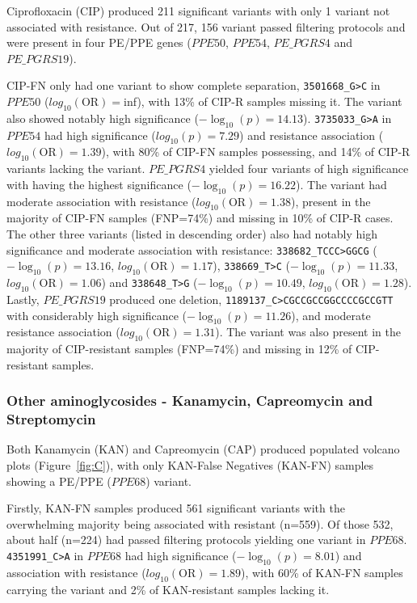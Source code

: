 Ciprofloxacin (CIP) produced 211 significant variants with only 1 variant not associated with resistance. Out of 217, 156 variant passed filtering protocols and were present in four PE/PPE genes ($PPE50$, $PPE54$, $PE\_PGRS4$ and $PE\_PGRS19$). 

CIP-FN only had one variant to show complete separation, \texttt{3501668\_G>C} in $PPE50$ ($log_{10}(\text{OR})=$inf), with 13\% of CIP-R samples missing it. The variant also showed notably high significance ($-\log_{10}(p)=14.13$). \texttt{3735033\_G>A} in $PPE54$ had high significance ($log_{10}(p)=7.29$) and resistance association ($log_{10}(\text{OR})=1.39$), with 80\% of CIP-FN samples possessing, and 14\% of CIP-R variants lacking the variant. $PE\_PGRS4$ yielded four variants of high significance with  having the highest significance ($-\log_{10}(p)=16.22$). The variant had moderate association with resistance ($log_{10}(\text{OR})=1.38$), present in the majority of CIP-FN samples (FNP=74\%) and missing in 10\% of CIP-R cases. The other three variants (listed in descending order) also had notably high significance and moderate association with resistance: \texttt{338682\_TCCC>GGCG} ($-\log_{10}(p)=13.16$, $log_{10}(\text{OR})=1.17$), \texttt{338669\_T>C} ($-\log_{10}(p)=11.33$, $log_{10}(\text{OR})=1.06$) and \texttt{338648\_T>G} ($-\log_{10}(p)=10.49$, $log_{10}(\text{OR})=1.28$). Lastly, $PE\_PGRS19$ produced one deletion, \texttt{1189137\_C>CGCCGCCGGCCCCGCCGTT} with considerably high significance ($-\log_{10}(p)=11.26$), and moderate resistance association ($log_{10}(\text{OR})=1.31$). The variant was also present in the majority of CIP-resistant samples (FNP=74\%) and missing in 12\% of CIP-resistant samples.

\subsubsection{Other aminoglycosides - Kanamycin, Capreomycin and Streptomycin}

Both Kanamycin (KAN) and Capreomycin (CAP) produced populated volcano plots (Figure~\ref{fig:C}), with only KAN-False Negatives (KAN-FN) samples showing a PE/PPE ($PPE68$) variant.

Firstly, KAN-FN samples produced 561 significant variants with the overwhelming majority being associated with resistant (n=559). Of those 532, about half (n=224) had passed filtering protocols yielding one variant in $PPE68$. \texttt{4351991\_C>A} in $PPE68$ had high significance ($-\log_{10}(p)=8.01$) and association with resistance ($log_{10}(\text{OR})=1.89$), with 60\% of KAN-FN samples carrying the variant and 2\% of KAN-resistant samples lacking it. 

